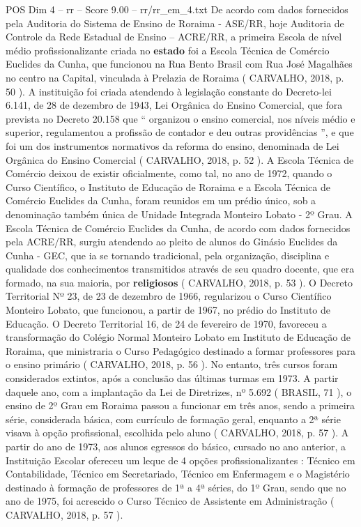 \begin{textsample}{POS Dim 4 – rr – Score 9.00 – rr/rr\_em\_4.txt}
De acordo com dados fornecidos pela Auditoria do Sistema de Ensino de Roraima - ASE/RR, hoje Auditoria de Controle da Rede Estadual de Ensino – ACRE/RR, a primeira Escola de nível médio profissionalizante criada no \textbf{estado} foi a Escola Técnica de Comércio Euclides da Cunha, que funcionou na Rua Bento Brasil com Rua José Magalhães no centro na Capital, vinculada à Prelazia de Roraima ( CARVALHO, 2018, p. 50 ).
A instituição foi criada atendendo à legislação constante do Decreto-lei 6.141, de 28 de dezembro de 1943, Lei Orgânica do Ensino Comercial, que fora prevista no Decreto 20.158 que “ organizou o ensino comercial, nos níveis médio e superior, regulamentou a profissão de contador e deu outras providências ”, e que foi um dos instrumentos normativos da reforma do ensino, denominada de Lei Orgânica do Ensino Comercial ( CARVALHO, 2018, p. 52 ).
A Escola Técnica de Comércio deixou de existir oficialmente, como tal, no ano de 1972, quando o Curso Científico, o Instituto de Educação de Roraima e a Escola Técnica de Comércio Euclides da Cunha, foram reunidos em um prédio único, sob a denominação também única de Unidade Integrada Monteiro Lobato - 2º Grau.
A Escola Técnica de Comércio Euclides da Cunha, de acordo com dados fornecidos pela ACRE/RR, surgiu atendendo ao pleito de alunos do Ginásio Euclides da Cunha - GEC, que ia se tornando tradicional, pela organização, disciplina e qualidade dos conhecimentos transmitidos através de seu quadro docente, que era formado, na sua maioria, por \textbf{religiosos} ( CARVALHO, 2018, p. 53 ).
O Decreto Territorial Nº 23, de 23 de dezembro de 1966, regularizou o Curso Científico Monteiro Lobato, que funcionou, a partir de 1967, no prédio do Instituto de Educação.
O Decreto Territorial 16, de 24 de fevereiro de 1970, favoreceu a transformação do Colégio Normal Monteiro Lobato em Instituto de Educação de Roraima, que ministraria o Curso Pedagógico destinado a formar professores para o ensino primário ( CARVALHO, 2018, p. 56 ).
No entanto, três cursos foram considerados extintos, após a conclusão das últimas turmas em 1973.
A partir daquele ano, com a implantação da Lei de Diretrizes, nº 5.692 ( BRASIL, 71 ), o ensino de 2º Grau em Roraima passou a funcionar em três anos, sendo a primeira série, considerada básica, com currículo de formação geral, enquanto a 2ª série visava à opção profissional, escolhida pelo aluno ( CARVALHO, 2018, p. 57 ).
A partir do ano de 1973, aos alunos egressos do básico, cursado no ano anterior, a Instituição Escolar ofereceu um leque de 4 opções profissionalizantes : Técnico em Contabilidade, Técnico em Secretariado, Técnico em Enfermagem e o Magistério destinado à formação de professores de 1ª a 4ª séries, do 1º Grau, sendo que no ano de 1975, foi acrescido o Curso Técnico de Assistente em Administração ( CARVALHO, 2018, p. 57 ).

\end{textsample}

